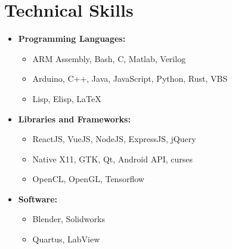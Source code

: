 \documentclass[10pt,letterpaper,sans]{moderncv}
\begin{document}
\section{Technical Skills}
\begin{itemize}
\item \textbf{Programming Languages:}
  \begin{itemize}
    \item {} ARM Assembly, Bash, C, Matlab, Verilog
    \item {} Arduino, C++, Java, JavaScript, Python, Rust, VBS
    \item {} Lisp, Elisp, \LaTeX
  \end{itemize}
\item \textbf{Libraries and Frameworks:} 
  \begin{itemize}
  \item {} ReactJS, VueJS, NodeJS, ExpressJS, jQuery
  \item {} Native X11, GTK, Qt, Android API, curses
  \item {} OpenCL, OpenGL, Tensorflow
  \end{itemize}
\item \textbf{Software:} 
  \begin{itemize}
  \item {} Blender, Solidworks
  \item {} Quartus, LabView
  \end{itemize}
\end{itemize}
\end{document}
